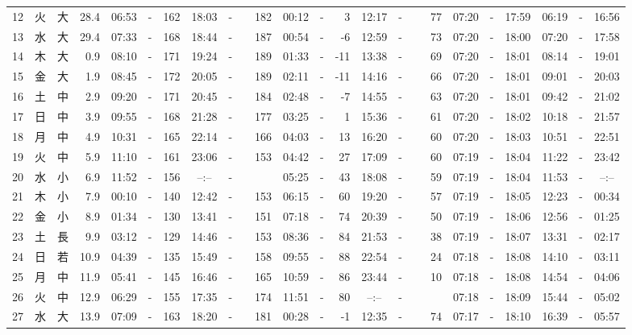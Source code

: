 \documentclass[12pt,a4j]{jsarticle}
\begin{document}
\begin{table}[htbp]
\begin{center}
{\begin{tabular}{|rc|cr|ccrccr|ccrccr|ccc|ccc|}
12 & 火 & 大 & 28.4 &  06:53 &-& 162 &  18:03 &-& 182 &  00:12 &-&   3 &  12:17 &-&  77 & 07:20 & -& 17:59 & 06:19 & -& 16:56 \\
13 & 水 & 大 & 29.4 &  07:33 &-& 168 &  18:44 &-& 187 &  00:54 &-&  -6 &  12:59 &-&  73 & 07:20 & -& 18:00 & 07:20 & -& 17:58 \\
14 & 木 & 大 &  0.9 &  08:10 &-& 171 &  19:24 &-& 189 &  01:33 &-& -11 &  13:38 &-&  69 & 07:20 & -& 18:01 & 08:14 & -& 19:01 \\
15 & 金 & 大 &  1.9 &  08:45 &-& 172 &  20:05 &-& 189 &  02:11 &-& -11 &  14:16 &-&  66 & 07:20 & -& 18:01 & 09:01 & -& 20:03 \\
16 & 土 & 中 &  2.9 &  09:20 &-& 171 &  20:45 &-& 184 &  02:48 &-&  -7 &  14:55 &-&  63 & 07:20 & -& 18:01 & 09:42 & -& 21:02 \\
17 & 日 & 中 &  3.9 &  09:55 &-& 168 &  21:28 &-& 177 &  03:25 &-&   1 &  15:36 &-&  61 & 07:20 & -& 18:02 & 10:18 & -& 21:57 \\
18 & 月 & 中 &  4.9 &  10:31 &-& 165 &  22:14 &-& 166 &  04:03 &-&  13 &  16:20 &-&  60 & 07:20 & -& 18:03 & 10:51 & -& 22:51 \\
19 & 火 & 中 &  5.9 &  11:10 &-& 161 &  23:06 &-& 153 &  04:42 &-&  27 &  17:09 &-&  60 & 07:19 & -& 18:04 & 11:22 & -& 23:42 \\
20 & 水 & 小 &  6.9 &  11:52 &-& 156 &  --:-- &-&~~~~~ &  05:25 &-&  43 &  18:08 &-&  59 & 07:19 & -& 18:04 & 11:53 & -& --:-- \\
21 & 木 & 小 &  7.9 &  00:10 &-& 140 &  12:42 &-& 153 &  06:15 &-&  60 &  19:20 &-&  57 & 07:19 & -& 18:05 & 12:23 & -& 00:34 \\
22 & 金 & 小 &  8.9 &  01:34 &-& 130 &  13:41 &-& 151 &  07:18 &-&  74 &  20:39 &-&  50 & 07:19 & -& 18:06 & 12:56 & -& 01:25 \\
23 & 土 & 長 &  9.9 &  03:12 &-& 129 &  14:46 &-& 153 &  08:36 &-&  84 &  21:53 &-&  38 & 07:19 & -& 18:07 & 13:31 & -& 02:17 \\
24 & 日 & 若 & 10.9 &  04:39 &-& 135 &  15:49 &-& 158 &  09:55 &-&  88 &  22:54 &-&  24 & 07:18 & -& 18:08 & 14:10 & -& 03:11 \\
25 & 月 & 中 & 11.9 &  05:41 &-& 145 &  16:46 &-& 165 &  10:59 &-&  86 &  23:44 &-&  10 & 07:18 & -& 18:08 & 14:54 & -& 04:06 \\
26 & 火 & 中 & 12.9 &  06:29 &-& 155 &  17:35 &-& 174 &  11:51 &-&  80 &  --:-- &-&~~~~~ & 07:18 & -& 18:09 & 15:44 & -& 05:02 \\
27 & 水 & 大 & 13.9 &  07:09 &-& 163 &  18:20 &-& 181 &  00:28 &-&  -1 &  12:35 &-&  74 & 07:17 & -& 18:10 & 16:39 & -& 05:57 \\

\end{tabular}}
\end{center}
\end{table}
\end{document}
